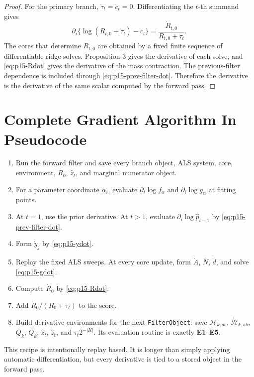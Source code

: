 \documentclass[11pt]{article}
\theoremstyle{definition}
\theoremstyle{remark}
\renewcommand{\[}{\begin{equation}}
\renewcommand{\]}{\end{equation}}
\begin{document}
\begin{proof}
For the primary branch, \(\dot\tau_t=\dot c_t=0\).  Differentiating the
\(t\)-th summand gives
\[
  \partial_i\{\log(R_{t,0}+\tau_t)-c_t\}
  =
  \frac{\dot R_{t,0}}{R_{t,0}+\tau_t}.
\]
The cores that determine \(R_{t,0}\) are obtained by a fixed finite sequence
of differentiable ridge solves.  Proposition 3 gives the derivative of each
solve, and \eqref{eq:p15-Rdot} gives the derivative of the mass contraction.
The previous-filter dependence is included through
\eqref{eq:p15-prev-filter-dot}.  Therefore the derivative is the derivative of
the same scalar computed by the forward pass.
\end{proof}

\section{Complete Gradient Algorithm In Pseudocode}

\begin{enumerate}[label=\textbf{G\arabic*.},leftmargin=*]
\item Run the forward filter and save every branch object, ALS system, core,
environment, \(R_0\), \(\widehat z_t\), and marginal numerator object.
\item For a parameter coordinate \(\alpha_i\), evaluate
\(\partial_i\log f_\alpha\) and \(\partial_i\log g_\alpha\) at fitting points.
\item At \(t=1\), use the prior derivative.  At \(t>1\), evaluate
\(\partial_i\log\widehat p_{t-1}\) by \eqref{eq:p15-prev-filter-dot}.
\item Form \(\dot y_j\) by \eqref{eq:p15-ydot}.
\item Replay the fixed ALS sweeps.  At every core update, form
\(\dot A\), \(\dot N\), \(\dot d\), and solve \eqref{eq:p15-gdot}.
\item Compute \(\dot R_0\) by \eqref{eq:p15-Rdot}.
\item Add \(\dot R_0/(R_0+\tau_t)\) to the score.
\item Build derivative environments for the next \texttt{FilterObject}: save
\(\mathcal H_{k,ab}\), \(\dot{\mathcal H}_{k,ab}\), \(Q_k\), \(\dot Q_k\),
\(\widehat z_t\), \(\dot{\widehat z}_t\), and \(\tau_t2^{-|K|}\).  Its
evaluation routine is exactly \textbf{E1}--\textbf{E5}.
\end{enumerate}

This recipe is intentionally replay based.  It is longer than simply applying
automatic differentiation, but every derivative is tied to a stored object in
the forward pass.
\end{document}
